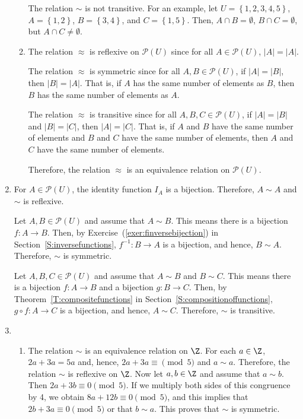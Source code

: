 \begin{enumerate}
\begin{enumerate}
The relation  $\sim$  is not transitive.  For an example, let  
$U = \left\{ {1, 2, 3, 4, 5} \right\}$, $A = \left\{ {1, 2} \right\}$, 
$B = \left\{ {3, 4} \right\}$, and  $C = \left\{ {1, 5} \right\}$.  Then,  
$A \cap B = \emptyset $,  $B \cap C = \emptyset $, but  $A \cap C \ne \emptyset $.

\item The relation  $ \approx $  is reflexive on  $\mathcal{P}\left( U \right)$  since for all  
$A \in \mathcal{P}\left( U \right)$,  $\left| A \right| = \left| A \right|$.

The relation  $ \approx $ is symmetric since  for all  $A, B \in \mathcal{P}\left( U \right)$, if  $\left| A \right| = \left| B \right|$, then  $\left| B \right| = \left| A \right|$.  That is, if  $A$  has the same number of elements as  $B$, then  $B$  has the same number of elements as  $A$.

The relation  $ \approx $ is transitive since  for all  $A, B, C \in \mathcal{P}\left( U \right)$, if  $\left| A \right| = \left| B \right|$ and  $\left| B \right| = \left| C \right|$, then  $\left| A \right| = \left| C \right|.$  That is,  if  $A$  and  $B$  have the same number of elements and  $B$  and  $C$  have the same number of elements, then  $A$  and  $C$  have the same number of elements.

Therefore, the relation $\approx$ is an equivalence relation on $\mathcal{P}\left( U \right)$.
\end{enumerate}




\item For $A \in \mathcal{P} \left( U \right)$, the identity function $I_A$ is a bijection.  Therefore, $A \sim A$ and $\sim$ is reflexive.

Let $A, B \in \mathcal{P} \left( U \right)$ and assume that $A \sim B$.  This means there is a bijection $f: A \to B$.  Then, by Exercise~(\ref{exer:finversebijection}) in 
Section~\ref{S:inversefunctions}, $f^{-1}:B \to A$ is a bijection, and hence, $B \sim A$.  Therefore, $\sim$ is symmetric.

Let $A, B, C \in \mathcal{P} \left( U \right)$ and assume that $A \sim B$ and $B \sim C$.  This means there is a bijection $f: A \to B$ and a bijection $g:B \to C$.  Then, by 
Theorem~\ref{T:compositefunctions} in Section~\ref{S:compositionoffunctions}, 
$g \circ f: A \to C$ is a bijection, and hence, $A \sim C$.  Therefore, $\sim$ is transitive.



\item \begin{enumerate}
\item The relation $\sim$ is an equivalence relation on $\Z$.  For each $a \in \Z$, 
$2a + 3a = 5a$ and, hence, $2a + 3a \equiv \pmod 5$ and $a \sim a$.  Therefore, the relation 
$\sim$ is reflexive on $\Z$.  Now let $a, b \in \Z$ and assume that $a \sim b$.  Then 
$2a + 3b \equiv 0 \pmod 5$.  If we multiply both sides of this congruence by 4, we obtain 
$8a + 12b \equiv 0 \pmod 5$, and this implies that $2b + 3a \equiv 0 \pmod 5$ or that 
$b \sim a$.  This proves that $\sim$ is symmetric.


\end{enumerate}
\end{enumerate}
